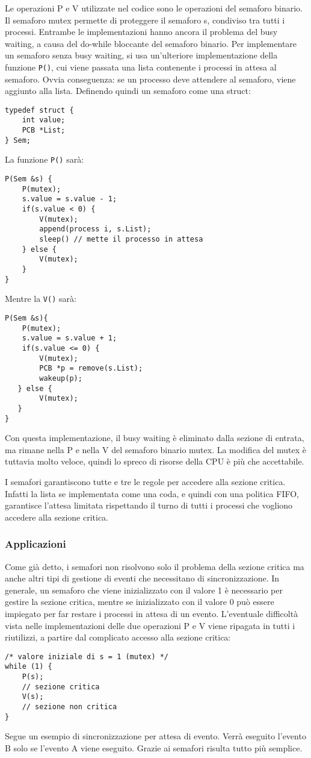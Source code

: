 \documentclass[a4paper]{article}
\begin{document}
Le operazioni P e V utilizzate nel codice sono le operazioni del semaforo binario. Il semaforo mutex permette di proteggere il semaforo s, condiviso tra tutti i processi. Entrambe le implementazioni hanno ancora il problema del busy waiting, a causa del do-while bloccante del semaforo binario.
Per implementare un semaforo senza busy waiting, si usa un'ulteriore implementazione della funzione \verb|P()|, cui viene passata una lista contenente i processi in attesa al semaforo. Ovvia conseguenza: se un processo deve attendere al semaforo, viene aggiunto alla lista. Definendo quindi un semaforo come una struct:
\begin{verbatim}
typedef struct {
    int value;
    PCB *List;
} Sem;
\end{verbatim}
La funzione \verb|P()| sarà:
\begin{verbatim}
P(Sem &s) {
    P(mutex);
    s.value = s.value - 1;
    if(s.value < 0) {
        V(mutex);
        append(process i, s.List);
        sleep() // mette il processo in attesa
    } else {
        V(mutex);
    }
}
\end{verbatim}
Mentre la \verb|V()| sarà:
\begin{verbatim}
P(Sem &s){
    P(mutex);
    s.value = s.value + 1;
    if(s.value <= 0) {
        V(mutex);
        PCB *p = remove(s.List);
        wakeup(p);
   } else {
        V(mutex);
   } 
}
\end{verbatim}

Con questa implementazione, il busy waiting è eliminato dalla sezione di entrata, ma rimane nella P e nella V del semaforo binario mutex. La modifica del mutex è tuttavia molto veloce, quindi lo spreco di risorse della CPU è più che accettabile.

I semafori garantiscono tutte e tre le regole per accedere alla sezione critica. Infatti la lista se implementata come una coda, e quindi con una politica FIFO, garantisce l’attesa limitata rispettando il turno di tutti i processi che vogliono accedere alla sezione critica.

\subsubsection{Applicazioni}
Come già detto, i semafori non risolvono solo il problema della sezione critica ma anche altri tipi di gestione di eventi che necessitano di sincronizzazione. In generale, un semaforo che viene inizializzato con il valore 1 è necessario per gestire la sezione critica, mentre se inizializzato con il valore 0 può essere impiegato per far restare i processi in attesa di un evento. L'eventuale difficoltà vista nelle implementazioni delle due operazioni P e V viene ripagata in tutti i riutilizzi, a partire dal complicato accesso alla sezione critica:
\begin{verbatim}
/* valore iniziale di s = 1 (mutex) */
while (1) {
    P(s);
    // sezione critica
    V(s);
    // sezione non critica
}
\end{verbatim}
Segue un esempio di sincronizzazione per attesa di evento. Verrà eseguito l’evento B solo se l’evento A viene eseguito. Grazie ai semafori risulta tutto più semplice.
\end{document}
